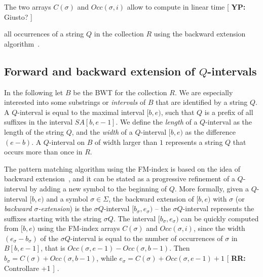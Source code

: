 \documentclass[runningheads,envcountsame,a4paper]{llncs}
\newcommand{\notaestesa}[2]{%
 \marginpar{\color{red!75!black}\textbf{\texttimes}}%
 {\color{red!75!black}%
 [\,\textbullet\,\textsf{\textbf{#1:}} %
 \textsf{\footnotesize#2}\,\textbullet\,]}%
}
\newcommand{\YP}[1]{\notaestesa{YP}{#1}}
\begin{document}

The two arrays $C(\sigma)$ and $Occ(\sigma, i)$
allow to compute in linear time
\YP{Giusto?}
all occurrences of a string $Q$ in the collection $R$
using the backward extension algorithm~\cite{Ferragina2005}.







\subsection{Forward and backward extension of $Q$-intervals}

In the following let $B$ be the BWT for the collection $R$.
We are especially interested into some substrings or \emph{intervals} of $B$ that are identified by a string $Q$.
A $Q$-interval is equal to the maximal interval $[b, e)$, such that
$Q$ is a prefix of all suffixes in the interval $SA[b, e-1]$.
We define the \emph{length} of a $Q$-interval as the length of
the string $Q$, and the \emph{width} of a $Q$-interval $[b, e)$ as the
difference $(e-b)$.
A $Q$-interval on $B$ of width larger than $1$ represents a string $Q$
that occurs more than once in $R$.

The pattern matching algorithm using the FM-index is based on the idea of backward extension~\cite{Ferragina2005},
and it can be stated as a progressive refinement of a $Q$-interval by adding a new symbol to the beginning of $Q$.
More formally, given a $Q$-interval $[b,e)$ and a symbol $\sigma \in \Sigma$, the backward
extension of $[b,e)$ with $\sigma$ (or \emph{backward
$\sigma$-extension}) is the $\sigma Q$-interval $[b_{\sigma},e_{\sigma})$
-- the $\sigma Q$-interval represents the  suffixes starting with
the string $\sigma Q$. The interval $[b_{\sigma},e_{\sigma})$ can be quickly computed
from $[b,e)$ using the FM-index arrays $C(\sigma)$ and
$Occ(\sigma, i)$, since the width $(e_{\sigma}-b_{\sigma})$ of the $\sigma Q$-interval is equal
to the number of occurrences of  $\sigma$ in $B[b,e-1]$, that is $Occ(\sigma, e-1)-Occ(\sigma, b-1)$. Then $b_{\sigma} =C(\sigma) + Occ(\sigma, b-1)$, while $e_{\sigma} =C(\sigma) + Occ(\sigma, e-1) +1 $ \notaestesa{RR}{Controllare +1}.
\end{document}
